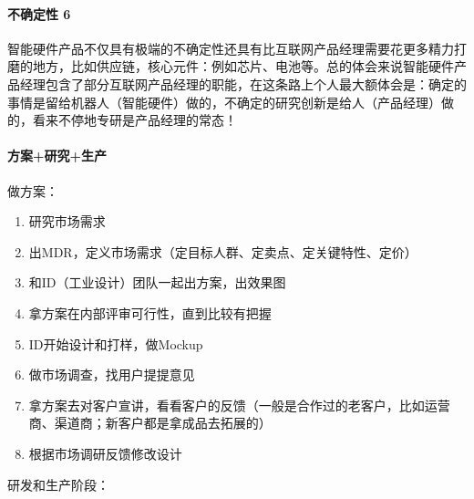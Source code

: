 \documentclass[letterpaper,11pt,english]{sphinxmanual}
\begin{document}
\paragraph{不确定性 6\sphinxfootnotemark[713]}
\label{\detokenize{chapter_project/AI_hardware:id1}}%
\begin{footnotetext}[713]\sphinxAtStartFootnote
{}
%
\end{footnotetext}\ignorespaces 
智能硬件产品不仅具有极端的不确定性还具有比互联网产品经理需要花更多精力打磨的地方，比如供应链，核心元件：例如芯片、电池等。总的体会来说智能硬件产品经理包含了部分互联网产品经理的职能，在这条路上个人最大额体会是：确定的事情是留给机器人（智能硬件）做的，不确定的研究创新是给人（产品经理）做的，看来不停地专研是产品经理的常态！


\paragraph{方案+研究+生产}
\label{\detokenize{chapter_project/AI_hardware:id2}}
做方案：
\begin{enumerate}
%
\item {} 
研究市场需求

\item {} 
出MDR，定义市场需求（定目标人群、定卖点、定关键特性、定价）

\item {} 
和ID（工业设计）团队一起出方案，出效果图

\item {} 
拿方案在内部评审可行性，直到比较有把握

\item {} 
ID开始设计和打样，做Mockup

\item {} 
做市场调查，找用户提提意见

\item {} 
拿方案去对客户宣讲，看看客户的反馈（一般是合作过的老客户，比如运营商、渠道商；新客户都是拿成品去拓展的）

\item {} 
根据市场调研反馈修改设计

\end{enumerate}

研发和生产阶段：
\end{document}
